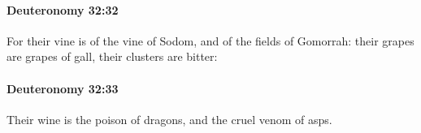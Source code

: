 		\paragraph{Deuteronomy 32:32} %
			\label{DEUTERONOMY-32-32}

			For their vine is of the vine of Sodom, and of the fields of Gomorrah: their grapes are grapes of gall, their clusters are bitter:


		\paragraph{Deuteronomy 32:33} %
			\label{DEUTERONOMY-32-33}

			Their wine is the poison of dragons, and the cruel venom of asps.


